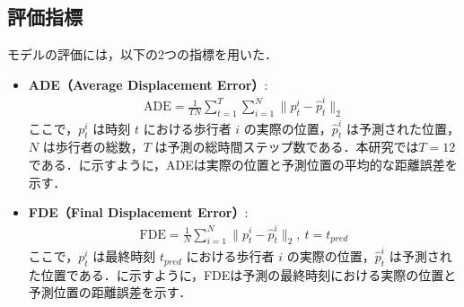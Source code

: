 \subsection{評価指標}
モデルの評価には，以下の2つの指標を用いた．

\begin{itemize}
  \item \textbf{ADE（Average Displacement Error）}\cite{pellegrini2009you-eth}:
    \begin{align}
      \text{ADE} = \frac{1}{TN} \sum_{t=1}^{T} \sum_{i=1}^{N} \| p^i_t - \hat{p}^i_t \|_2
    \end{align}
    ここで，$p^i_t$ は時刻 $t$ における歩行者 $i$ の実際の位置，$\hat{p}^i_t$ は予測された位置，$N$ は歩行者の総数，$T$ は予測の総時間ステップ数である．本研究では$T = 12$である．に示すように，ADEは実際の位置と予測位置の平均的な距離誤差を示す．
    \\
    \item \textbf{FDE（Final Displacement Error）}\cite{s-lstm}:
    \begin{align}
      \text{FDE} = \frac{1}{N} \sum_{i=1}^{N} \| p^i_t - \hat{p}^i_t \|_2 , \ t = t_{pred}
    \end{align}
    ここで，$p^i_t$ は最終時刻 $t_{pred}$ における歩行者 $i$ の実際の位置，$\hat{p}^i_t$ は予測された位置である．に示すように，FDEは予測の最終時刻における実際の位置と予測位置の距離誤差を示す．
\end{itemize}

